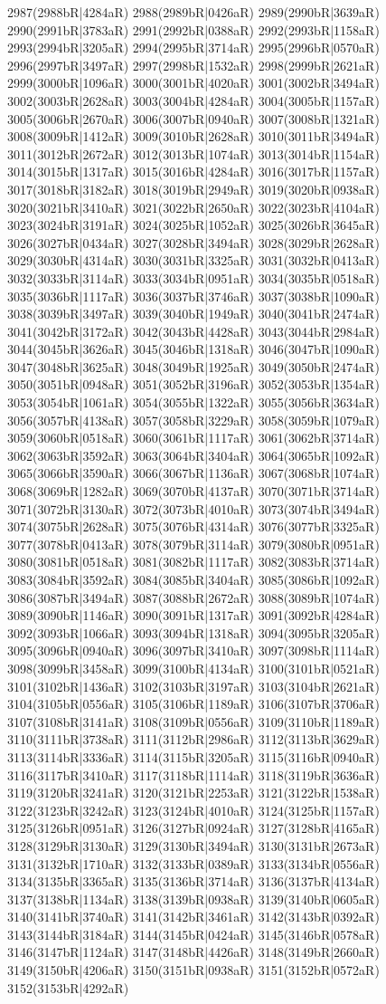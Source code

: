 2987(2988bR|4284aR) 2988(2989bR|0426aR) 2989(2990bR|3639aR) 2990(2991bR|3783aR) 2991(2992bR|0388aR) 2992(2993bR|1158aR) 2993(2994bR|3205aR) 2994(2995bR|3714aR) 2995(2996bR|0570aR) 2996(2997bR|3497aR) 2997(2998bR|1532aR) 2998(2999bR|2621aR) 2999(3000bR|1096aR) 3000(3001bR|4020aR) 3001(3002bR|3494aR) 3002(3003bR|2628aR) 3003(3004bR|4284aR) 3004(3005bR|1157aR) 3005(3006bR|2670aR) 3006(3007bR|0940aR) 3007(3008bR|1321aR) 3008(3009bR|1412aR) 3009(3010bR|2628aR) 3010(3011bR|3494aR) 3011(3012bR|2672aR) 3012(3013bR|1074aR) 3013(3014bR|1154aR) 3014(3015bR|1317aR) 3015(3016bR|4284aR) 3016(3017bR|1157aR) 3017(3018bR|3182aR) 3018(3019bR|2949aR) 3019(3020bR|0938aR) 3020(3021bR|3410aR) 3021(3022bR|2650aR) 3022(3023bR|4104aR) 3023(3024bR|3191aR) 3024(3025bR|1052aR) 3025(3026bR|3645aR) 3026(3027bR|0434aR) 3027(3028bR|3494aR) 3028(3029bR|2628aR) 3029(3030bR|4314aR) 3030(3031bR|3325aR) 3031(3032bR|0413aR) 3032(3033bR|3114aR) 3033(3034bR|0951aR) 3034(3035bR|0518aR) 3035(3036bR|1117aR) 3036(3037bR|3746aR) 3037(3038bR|1090aR) 3038(3039bR|3497aR) 3039(3040bR|1949aR) 3040(3041bR|2474aR) 3041(3042bR|3172aR) 3042(3043bR|4428aR) 3043(3044bR|2984aR) 3044(3045bR|3626aR) 3045(3046bR|1318aR) 3046(3047bR|1090aR) 3047(3048bR|3625aR) 3048(3049bR|1925aR) 3049(3050bR|2474aR) 3050(3051bR|0948aR) 3051(3052bR|3196aR) 3052(3053bR|1354aR) 3053(3054bR|1061aR) 3054(3055bR|1322aR) 3055(3056bR|3634aR) 3056(3057bR|4138aR) 3057(3058bR|3229aR) 3058(3059bR|1079aR) 3059(3060bR|0518aR) 3060(3061bR|1117aR) 3061(3062bR|3714aR) 3062(3063bR|3592aR) 3063(3064bR|3404aR) 3064(3065bR|1092aR) 3065(3066bR|3590aR) 3066(3067bR|1136aR) 3067(3068bR|1074aR) 3068(3069bR|1282aR) 3069(3070bR|4137aR) 3070(3071bR|3714aR) 3071(3072bR|3130aR) 3072(3073bR|4010aR) 3073(3074bR|3494aR) 3074(3075bR|2628aR) 3075(3076bR|4314aR) 3076(3077bR|3325aR) 3077(3078bR|0413aR) 3078(3079bR|3114aR) 3079(3080bR|0951aR) 3080(3081bR|0518aR) 3081(3082bR|1117aR) 3082(3083bR|3714aR) 3083(3084bR|3592aR) 3084(3085bR|3404aR) 3085(3086bR|1092aR) 3086(3087bR|3494aR) 3087(3088bR|2672aR) 3088(3089bR|1074aR) 3089(3090bR|1146aR) 3090(3091bR|1317aR) 3091(3092bR|4284aR) 3092(3093bR|1066aR) 3093(3094bR|1318aR) 3094(3095bR|3205aR) 3095(3096bR|0940aR) 3096(3097bR|3410aR) 3097(3098bR|1114aR) 3098(3099bR|3458aR) 3099(3100bR|4134aR) 3100(3101bR|0521aR) 3101(3102bR|1436aR) 3102(3103bR|3197aR) 3103(3104bR|2621aR) 3104(3105bR|0556aR) 3105(3106bR|1189aR) 3106(3107bR|3706aR) 3107(3108bR|3141aR) 3108(3109bR|0556aR) 3109(3110bR|1189aR) 3110(3111bR|3738aR) 3111(3112bR|2986aR) 3112(3113bR|3629aR) 3113(3114bR|3336aR) 3114(3115bR|3205aR) 3115(3116bR|0940aR) 3116(3117bR|3410aR) 3117(3118bR|1114aR) 3118(3119bR|3636aR) 3119(3120bR|3241aR) 3120(3121bR|2253aR) 3121(3122bR|1538aR) 3122(3123bR|3242aR) 3123(3124bR|4010aR) 3124(3125bR|1157aR) 3125(3126bR|0951aR) 3126(3127bR|0924aR) 3127(3128bR|4165aR) 3128(3129bR|3130aR) 3129(3130bR|3494aR) 3130(3131bR|2673aR) 3131(3132bR|1710aR) 3132(3133bR|0389aR) 3133(3134bR|0556aR) 3134(3135bR|3365aR) 3135(3136bR|3714aR) 3136(3137bR|4134aR) 3137(3138bR|1134aR) 3138(3139bR|0938aR) 3139(3140bR|0605aR) 3140(3141bR|3740aR) 3141(3142bR|3461aR) 3142(3143bR|0392aR) 3143(3144bR|3184aR) 3144(3145bR|0424aR) 3145(3146bR|0578aR) 3146(3147bR|1124aR) 3147(3148bR|4426aR) 3148(3149bR|2660aR) 3149(3150bR|4206aR) 3150(3151bR|0938aR) 3151(3152bR|0572aR) 3152(3153bR|4292aR) 